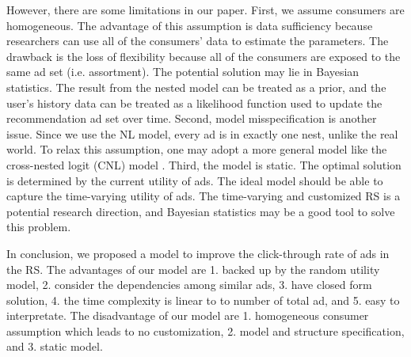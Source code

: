 \documentclass[12pt]{article}
\theoremstyle{definition}
\begin{document}
\begin{sloppypar}
However, there are some limitations in our paper. First, we assume consumers are homogeneous. The advantage of this assumption is data sufficiency because researchers can use all of the consumers' data to estimate the parameters. The drawback is the loss of flexibility because all of the consumers are exposed to the same ad set (i.e. assortment). The potential solution may lie in Bayesian statistics. The result from the nested model can be treated as a prior, and the user's history data can be treated as a likelihood function used to update the recommendation ad set over time. Second, model misspecification is another issue. Since we use the NL model, every ad is in exactly one nest, unlike the real world. To relax this assumption, one may adopt a more general model like the cross-nested logit (CNL) model \textcite{vovsha}. Third, the model is static. The optimal solution is determined by the current utility of ads. The ideal model should be able to capture the time-varying utility of ads. The time-varying and customized RS is a potential research direction, and Bayesian statistics may be a good tool to solve this problem.

In conclusion, we proposed a model to improve the click-through rate of ads in the RS. The advantages of our model are 1. backed up by the random utility model, 2. consider the dependencies among similar ads, 3. have closed form solution, 4. the time complexity is linear to to number of total ad, and 5. easy to interpretate. The disadvantage of our model are 1. homogeneous consumer assumption which leads to no customization, 2. model and structure specification, and 3. static model.

\printbibliography


\end{sloppypar}
\end{document}
